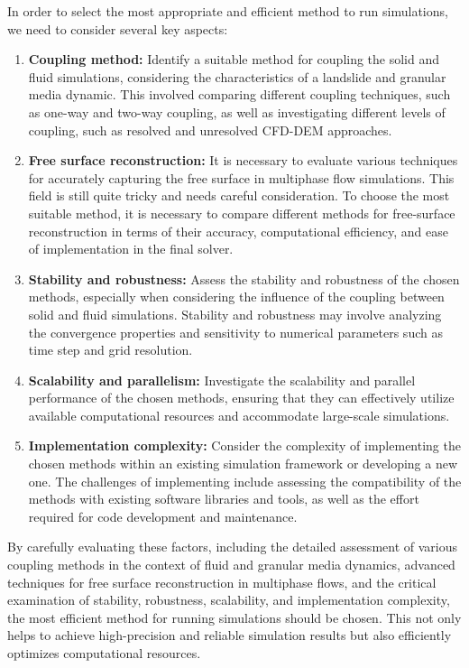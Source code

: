 In order to select the most appropriate and efficient method to run simulations, we need to consider several key aspects:
\begin{enumerate}
    \item \textbf{Coupling method:} Identify a suitable method for coupling the solid and fluid simulations, considering the characteristics of a landslide and granular media dynamic. This involved comparing different coupling techniques, such as one-way and two-way coupling, as well as investigating different levels of coupling, such as resolved and unresolved CFD-DEM approaches.
    \item \textbf{Free surface reconstruction:} It is necessary to evaluate various techniques for accurately capturing the free surface in multiphase flow simulations. This field is still quite tricky and needs careful consideration. To choose the most suitable method, it is necessary to compare different methods for free-surface reconstruction in terms of their accuracy, computational efficiency, and ease of implementation in the final solver.
    \item \textbf{Stability and robustness:} Assess the stability and robustness of the chosen methods, especially when considering the influence of the coupling between solid and fluid simulations. Stability and robustness may involve analyzing the convergence properties and sensitivity to numerical parameters such as time step and grid resolution.
    \item \textbf{Scalability and parallelism:} Investigate the scalability and parallel performance of the chosen methods, ensuring that they can effectively utilize available computational resources and accommodate large-scale simulations.
    \item \textbf{Implementation complexity:} Consider the complexity of implementing the chosen methods within an existing simulation framework or developing a new one. The challenges of implementing include assessing the compatibility of the methods with existing software libraries and tools, as well as the effort required for code development and maintenance.
\end{enumerate}

By carefully evaluating these factors, including the detailed assessment of various coupling methods in the context of fluid and granular media dynamics, advanced techniques for free surface reconstruction in multiphase flows, and the critical examination of stability, robustness, scalability, and implementation complexity, the most efficient method for running simulations should be chosen. This not only helps to achieve high-precision and reliable simulation results but also efficiently optimizes computational resources.

